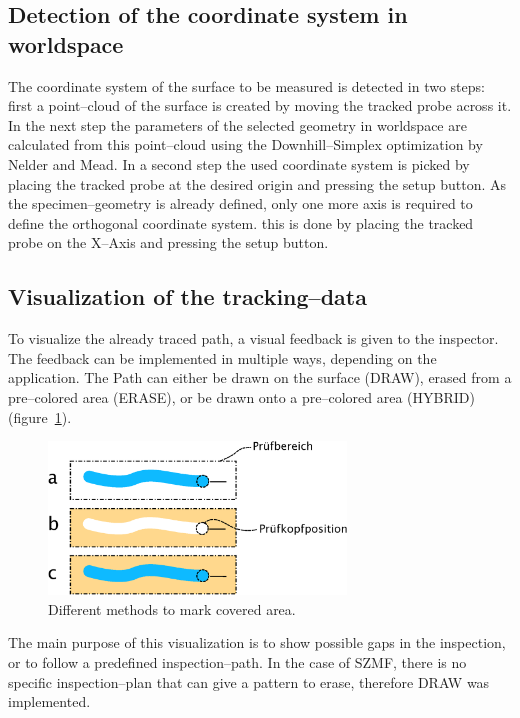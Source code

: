 \documentclass{VRARWorkshop}
\begin{document}
\subsection{Detection of the coordinate system in worldspace}
The coordinate system of the surface to be measured is detected in two steps:
first a point--cloud of the surface is created by moving the tracked probe across it.
In the next step the parameters of the selected geometry in worldspace are calculated from this point--cloud using the Downhill--Simplex optimization by Nelder and Mead.
In a second step the used coordinate system is picked by placing the tracked probe at the desired origin and pressing the setup button.
As the specimen--geometry is already defined, only one more axis is required to define the orthogonal coordinate system.
this is done by placing the tracked probe on the X--Axis and pressing the setup button.

\subsection{Visualization of the tracking--data}

To visualize the already traced path, a visual feedback is given to the inspector.
The feedback can be implemented in multiple ways, depending on the application.
The Path can either be drawn on the surface (DRAW), erased from a pre--colored area (ERASE), or be drawn onto a pre--colored area (HYBRID) (figure~\ref{fig:DrawVsErase}).

\begin{figure}[h!]
    \begin{center}
        \includegraphics[width=79mm]{images/DrawVsErase.eps}
        \caption{\label{fig:DrawVsErase} Different methods to mark covered area.}
    \end{center}
\end{figure}

The main purpose of this visualization is to show possible gaps in the inspection, or to follow a predefined inspection--path.
In the case of SZMF, there is no specific inspection--plan that can give a pattern to erase, therefore DRAW was implemented.
\end{document}
